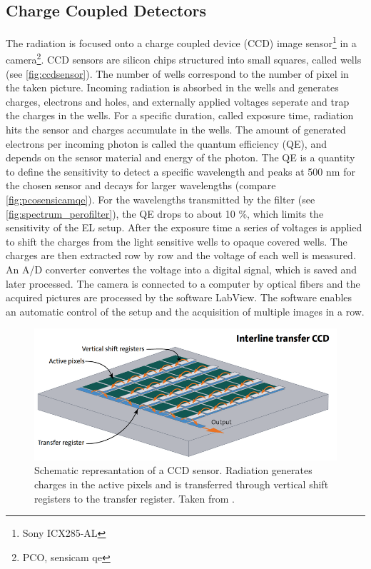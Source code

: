 \subsection{Charge Coupled Detectors}
The radiation is focused onto a charge coupled device (CCD) image sensor\footnote{Sony ICX285-AL} in a camera\footnote{PCO, sensicam qe}. CCD sensors are silicon chips structured into small squares, called wells \cite{SchnellCCD1993}(see \autoref{fig:ccdsensor}). The number of wells correspond to the number of pixel in the taken picture. Incoming radiation is absorbed in the wells and  generates charges, electrons and holes, and externally applied voltages seperate and trap the charges in the wells. For a specific duration, called exposure time, radiation hits the sensor and charges accumulate in the wells. The amount of generated electrons per incoming photon is called the quantum efficiency (QE), and depends on the sensor material and energy of the photon. The QE is a quantity to define the sensitivity to detect a specific wavelength and peaks at 500 nm for the chosen sensor and decays for larger wavelengths (compare \autoref{fig:pcosensicamqe}). For the wavelengths transmitted by the filter (see \autoref{fig:spectrum_perofilter}), the QE drops to about 10 \%, which limits the sensitivity of the EL setup. After the exposure time a series of voltages is applied to shift the charges from the light sensitive wells to opaque covered wells. The charges are then extracted row by row and the voltage of each well is measured. An A/D converter convertes the voltage into a digital signal, which is saved and later processed. The camera is connected to a computer by optical fibers and the acquired pictures are processed by the software LabView. The software enables an automatic control of the setup and the acquisition of multiple images in a row.
\begin{figure}
	\centering
	\includegraphics[width=\linewidth]{Images/ExperimentalSetup/ccd-sensor-interline-transfer-en}
	\caption{Schematic represantation of a CCD sensor. Radiation generates charges in the active pixels and is transferred through vertical shift registers to the transfer register. Taken from \cite{StemmerCCD}.}
	\label{fig:ccdsensor}
\end{figure}

